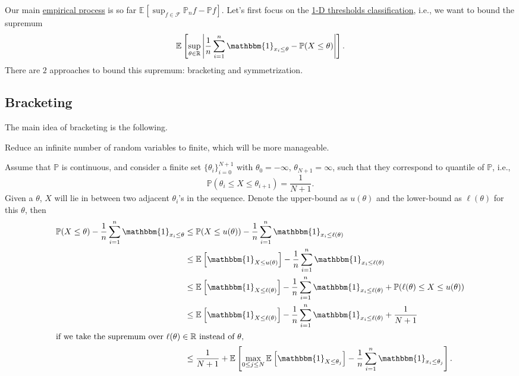 Our main \hyperref[def:EP]{empirical process} is so far \(\mathbb{E}_{}\left[\sup _{f\in \mathscr{F} } \mathbb{P} _n f - \mathbb{P} f \right]\). Let's first focus on the \hyperref[eg:1D-classification-thresholds]{1-D thresholds classification}, i.e., we want to bound the supremum
\[
  \mathbb{E}_{}\left[\sup _{\theta \in \mathbb{R} } \left\vert \frac{1}{n} \sum_{i=1}^{n} \mathbbm{1}_{x_i \leq \theta } - \mathbb{P} (X \leq \theta ) \right\vert \right] .
\]
There are \(2\) approaches to bound this supremum: bracketing and symmetrization.

\subsection{Bracketing}
The main idea of bracketing is the following.

\begin{intuition}
  Reduce an infinite number of random variables to finite, which will be more manageable.
\end{intuition}

Assume that \(\mathbb{P} \) is continuous, and consider a finite set \(\{ \theta _i \}_{i = 0}^{N+1} \) with \(\theta _0 = -\infty \), \(\theta _{N+1} = \infty \), such that they correspond to quantile of \(\mathbb{P} \), i.e.,
\[
  \mathbb{P} (\theta _i \leq X \leq \theta _{i+1}) = \frac{1}{N+1}.
\]
Given a \(\theta \), \(X\) will lie in between two adjacent \(\theta _i\)'s in the sequence. Denote the upper-bound as \(u(\theta )\) and the lower-bound as \(\ell (\theta )\) for this \(\theta \), then
\begin{align}
  \mathbb{P} (X \leq \theta ) - \frac{1}{n} \sum_{i=1}^{n} \mathbbm{1}_{x_i \leq \theta }
   & \leq \mathbb{P} (X \leq u(\theta )) - \frac{1}{n}\sum_{i=1}^{n} \mathbbm{1}_{x_i \leq \ell (\theta )}                                                                                           \nonumber            \\
   & \leq \mathbb{E}_{}\left[\mathbbm{1}_{X \leq u(\theta )}  \right] - \frac{1}{n}\sum_{i=1}^{n} \mathbbm{1}_{x_i \leq \ell (\theta )}                                                              \nonumber            \\
   & \leq \mathbb{E}_{}\left[\mathbbm{1}_{X \leq \ell (\theta )}  \right] - \frac{1}{n}\sum_{i=1}^{n} \mathbbm{1}_{x_i \leq \ell (\theta )} + \mathbb{P} (\ell (\theta ) \leq X \leq u(\theta ))     \nonumber            \\
   & \leq \mathbb{E}_{}\left[\mathbbm{1}_{X \leq \ell (\theta )}  \right] - \frac{1}{n}\sum_{i=1}^{n} \mathbbm{1}_{x_i \leq \ell (\theta )} + \frac{1}{N+1}                                          \nonumber            \\
  \shortintertext{if we take the supremum over \(\ell (\theta) \in \mathbb{R} \) instead of \(\theta \),}
   & \leq \frac{1}{N+1} + \mathbb{E}_{}\left[\max _{0 \leq j \leq N} \mathbb{E}_{}\left[\mathbbm{1}_{X \leq \theta _j}\right] - \frac{1}{n} \sum_{i=1}^{n} \mathbbm{1}_{x_i \leq \theta _j} \right].\label{eq:bracketing}
\end{align}

